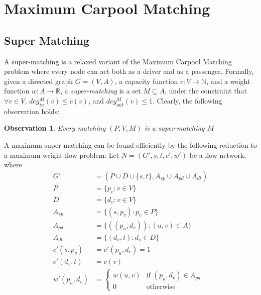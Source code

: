 \documentclass[]{llncs}
\def\R{\mathbb{R}}
\def\N{\mathbb{N}}
\newtheorem{observation}{Observation}
\newcommand{\din}[1][M]{deg^M_{in}}
\newcommand{\dout}[1][M]{deg^M_{out}}
\def\CARPOOL{Maximum Carpool Ma\-tching}
\begin{document}
\section{\CARPOOL{}}
\label{sec:cm}
	\subsection{Super Matching}
A super-matching is a relaxed variant of the \CARPOOL{} problem 
where every node can act both as a driver and as a passenger. 
Formally, given a directed graph $G = (V, A)$, 
a capacity function $ c: V \rightarrow \N $,
and a weight function $w : A \rightarrow \R$,
a \emph{super-matching} is a set $M \subseteq A$, 
under the constraint that $\forall v \in V$,
$\din(v) \leq c(v)$, and $\dout(v) \leq 1$. 
%
Clearly, the following observation holds:
\begin{observation}
\label{ob:matching is super}
Every matching $(P, V, M)$ is a super-matching $M$
\end{observation}

A maximum super matching can be found efficiently by the following reduction 
to a maximum weight flow problem: 
Let $N = (G', s, t, c', w')$ be a flow network, where 
\begin{align*}
G'				& = (P \cup D \cup \{s, t\}, A_{sp} \cup A_{pd} \cup A_{dt})	\\
P				& = \{p_v : v \in V\}					\\
D				& = \{d_v : v \in V\}					\\
A_{sp}			& = \{ (s, p_v) : p_v \in P \}			\\
A_{pd}			& = \{ ((p_u, d_v)) : (u, v) \in A \}	\\
A_{dt}			& = \{ (d_v, t) : d_v \in D \}			\\
c'(s, p_v)		& = c'(p_u, d_v) = 1					\\
c'(d_v, t)		& = c(v)								\\
w'(p_u, d_v)	& = 
\begin{cases}
w(u, v) & \text{if } (p_u, d_v) \in A_{pd} \\
0 & \text{otherwise}	
\end{cases}
\end{align*}
\end{document}
